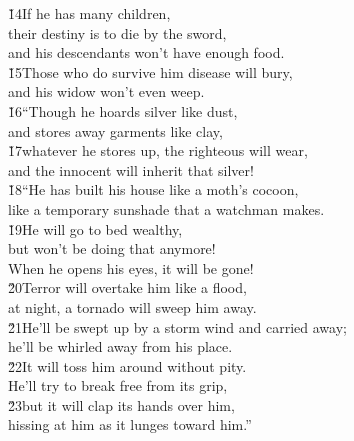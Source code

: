 \begin{poetry}
\poeml \v{14}If he has many children, \\
\poemll    their destiny is to die by the sword, \\
\poemll    and his descendants won't have enough food. \\
\poeml \v{15}Those who do survive him disease will bury, \\
\poemll    and his widow won't even weep. \\
\poeml \v{16}``Though he hoards silver like dust, \\
\poemll    and stores away garments like clay, \\
\poeml \v{17}whatever he stores up, the righteous will wear, \\
\poemll    and the innocent will inherit that silver! \\
\poeml \v{18}``He has built his house like a moth's cocoon, \\
\poemll    like a temporary sunshade that a watchman makes. \\
\poeml \v{19}He will go to bed wealthy, \\
\poemll    but won't be doing that anymore! \\
\poemlll       When he opens his eyes, it will be gone! \\
\poeml \v{20}Terror will overtake him like a flood, \\
\poemll    at night, a tornado will sweep him away. \\
\poeml \v{21}He'll be swept up by a storm wind and carried away; \\
\poemll    he'll be whirled away from his place. \\
\poeml \v{22}It will toss him around without pity. \\
\poemll    He'll try to break free from its grip, \\
\poeml \v{23}but it will clap its hands over him, \\
\poemll    hissing at him as it lunges toward him.''
\end{poetry}

